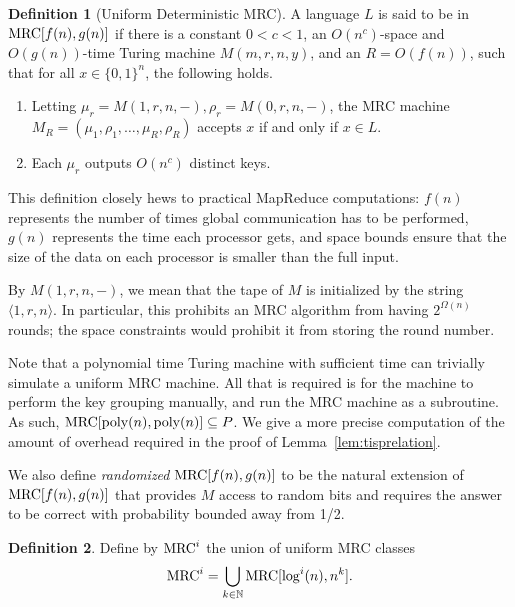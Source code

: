 \documentclass[letterpaper,USenglish]{lipics}
\theoremstyle{definition}
\newtheorem{defn}{Definition}
\theoremstyle{remark}
\newcommand{\N}{\mathbb{N}}
\newcommand{\mrc}{\textup{MRC}}
\begin{document}
\begin{defn}[Uniform Deterministic MRC]

A language $L$ is said to be in $\mrc[f(n),g(n)]$ if there is a constant $0 < c
< 1$, an $O(n^c)$-space and $O(g(n))$-time Turing machine $M(m, r, n, y)$, and
an $R = O(f(n))$, such that for all $x \in \{ 0,1 \}^n$, the following holds.

\begin{enumerate}
\item Letting $\mu_r = M(1, r, n, -), \rho_r = M(0, r, n, -)$, the MRC machine
$M_R = (\mu_1, \rho_1, \dots, \mu_R, \rho_R)$ accepts $x$ if and only if $x \in
L$.

\item Each $\mu_r$ outputs $O(n^c)$ distinct keys.
\end{enumerate}

\end{defn}

This definition closely hews to practical MapReduce computations:  $f(n)$
represents the number of times global communication has to be performed, $g(n)$
represents the  time each processor gets, and space bounds ensure that the size
of the data on each processor is  smaller than the full input.

\begin{remark}
By $M(1, r, n, -)$, we mean that the tape of $M$ is initialized by the string
$\langle 1, r, n \rangle$. In particular, this prohibits an MRC algorithm from
having $2^{\Omega(n)}$ rounds; the space constraints would prohibit it from
storing the round number.
\end{remark}

\begin{remark}\label{remark:timebound}
Note that a polynomial time Turing machine with sufficient time can trivially
simulate a uniform MRC machine. All that is required is for the machine to
perform the key grouping manually, and run the MRC machine as a subroutine. As
such, $\mrc[\text{poly}(n), \text{poly}(n)] \subseteq P$. We give a more precise
computation of the amount of overhead required in the proof of
Lemma~\ref{lem:tisprelation}.
\end{remark}

We also define \emph{randomized} $\mrc[f(n), g(n)]$ to be the natural extension
of $\mrc[f(n), g(n)]$ that provides $M$ access to random bits and requires the
answer to be correct with probability bounded away from 1/2.

\begin{defn}
Define by $\mrc^i$ the union of uniform MRC classes
\[
   \mrc^i = \bigcup_{k\in\N}\mrc[\log^i(n),n^k].
\]
\end{defn}
\end{document}
